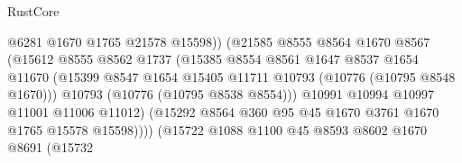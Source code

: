 \begin{lexlean}{RustCore}
\begin{coremodule}
                                        @6281
                                        @1670
                                        @1765
                                        @21578
                                        @15598))
                                    (@21585
                                      @8555
                                      @8564
                                      @1670
                                      @8567
                                      (@15612
                                        @8555
                                        @8562
                                        @1737
                                        (@15385
                                          @8554
                                          @8561
                                          @1647
                                          @8537
                                          @1654
                                          @11670
                                          (@15399
                                            @8547
                                            @1654
                                            @15405
                                            @11711
                                            @10793
                                            (@10776 (@10795 @8548 @1670)))
                                          @10793
                                          (@10776 (@10795 @8538 @8554)))
                                        @10991
                                        @10994
                                        @10997
                                        @11001
                                        @11006
                                        @11012)
                                      (@15292
                                        @8564
                                        @360
                                        @95
                                        @45
                                        @1670
                                        @3761
                                        @1670
                                        @1765
                                        @15578
                                        @15598))))
                                (@15722
                                  @1088
                                  @1100
                                  @45
                                  @8593
                                  @8602
                                  @1670
                                  @8691
                                  (@15732

\end{coremodule}
\end{lexlean}
